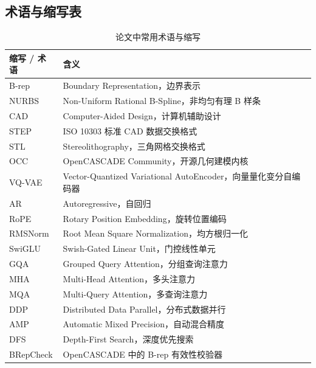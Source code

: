 
\begin{thesisappendix}

\section{术语与缩写表}

\begin{table}[!h]
    \caption{论文中常用术语与缩写}
    \label{tab:abbreviations}
    \begin{tabularx}{\textwidth}{p{2.5cm}L}
        \toprule
        缩写 / 术语 & 含义 \\
        \midrule
        B-rep        & Boundary Representation，边界表示 \\
        NURBS        & Non-Uniform Rational B-Spline，非均匀有理 B 样条 \\
        CAD          & Computer-Aided Design，计算机辅助设计 \\
        STEP         & ISO 10303 标准 CAD 数据交换格式 \\
        STL          & Stereolithography，三角网格交换格式 \\
        OCC          & OpenCASCADE Community，开源几何建模内核 \\
        VQ-VAE       & Vector-Quantized Variational AutoEncoder，向量量化变分自编码器 \\
        AR           & Autoregressive，自回归 \\
        RoPE         & Rotary Position Embedding，旋转位置编码 \\
        RMSNorm      & Root Mean Square Normalization，均方根归一化 \\
        SwiGLU       & Swish-Gated Linear Unit，门控线性单元 \\
        GQA          & Grouped Query Attention，分组查询注意力 \\
        MHA          & Multi-Head Attention，多头注意力 \\
        MQA          & Multi-Query Attention，多查询注意力 \\
        DDP          & Distributed Data Parallel，分布式数据并行 \\
        AMP          & Automatic Mixed Precision，自动混合精度 \\
        DFS          & Depth-First Search，深度优先搜索 \\
        BRepCheck    & OpenCASCADE 中的 B-rep 有效性校验器 \\
        \bottomrule
    \end{tabularx}
\end{table}


\end{thesisappendix}
